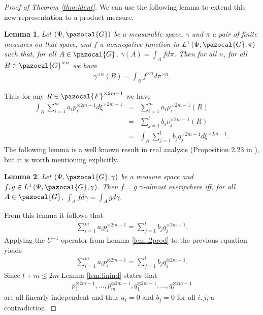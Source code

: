 \documentclass[aos,preprint]{imsart}
\def\sF{\pazocal{F}}
\def\sG{\pazocal{G}}
\theoremstyle{plain}
\newtheorem{lem}{Lemma}[section]
\theoremstyle{defintion}
\begin{document}
\begin{proof}[Proof of Theorem \ref{thm:ident}]
		We can use the following lemma to extend this new representation to a product measure.

		\begin{lem} \label{lem:radprod}
			Let $\left( \Psi, \sG \right)$ be a measurable space, $\gamma$ and $\pi$ a pair of finite measures on that space, and $f$ a nonnegative function in $L^1\left(\Psi,\sG, \pi \right)$ such that, for all $A \in \sG$, $\gamma\left( A \right)=\int_A f d\pi$. Then for all $n$, for all $B \in \sG^{\times n}$ we have
			\begin{eqnarray*}
				\gamma^{\times n}\left( B \right) = \int_B f^{\times n} d\pi^{\times n}.
			\end{eqnarray*}
		\end{lem}
		Thus for any $R \in \sF^{\times 2m-1}$  we have
		\begin{eqnarray*}
			\int_R \sum_{i=1}^{m} a_i p_i^{\times 2m-1} d\xi^{\times 2m-1} 
			&=&  \sum_{i=1}^{m} a_i \mu_i^{\times 2m-1}\left( R \right)\\
		 &=&  \sum_{j=1}^{l} b_j \nu_j^{\times 2m-1}\left( R \right)\\
		 &=& \int_R \sum_{j=1}^{l} b_j q_j^{\times 2m-1}d\xi^{\times 2m-1}.
		\end{eqnarray*}
		The following lemma is a well known result in real analysis (Proposition 2.23 in \cite{folland99}), but it is worth mentioning explicitly.
		\begin{lem} \label{lem:inteq}
			Let $\left( \Psi,\sG,\gamma \right)$ be a measure space and $f,g \in L^1\left( \Psi,\sG,\gamma \right)$. Then $f=g$ $\gamma$-almost everywhere iff, for all $A\in \sG$, $\int_A f d\gamma = \int_A g d\gamma$.
		\end{lem}
		From this lemma it follows that
		\begin{eqnarray*}
			\sum_{i=1}^{m} a_i p_i^{\times 2m-1} = \sum_{j=1}^{l} b_j q_j^{\times 2m-1}.
		\end{eqnarray*}
		Applying the $U^{-1}$ operator from Lemma \ref{lem:l2prod} to the previous equation yields
		\begin{eqnarray*}
			\sum_{i=1}^{m} a_i p_i^{\otimes 2m-1} = \sum_{j=1}^{l} b_j q_j^{\otimes 2m-1}.
		\end{eqnarray*}
		Since $l+m \le2m$ Lemma \ref{lem:linind} states that 
		\begin{align*}
			p_1^{\otimes 2m-1},\ldots,p_{m}^{\otimes 2m-1},q_1^{\otimes 2m-1},\ldots,q_{l}^{\otimes 2m-1}
		\end{align*}
		are all linearly independent and thus $a_i = 0$ and $b_j = 0$ for all $i,j$, a contradiction.
	\end{proof}
\end{document}
